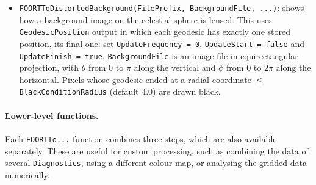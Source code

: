 \documentclass[11pt,a4paper]{article}
\newcommand{\code}[1]{{\tt #1}}
\begin{document}
\begin{itemize}
 \item \code{FOORTToDistortedBackground(FilePrefix, BackgroundFile, ...)}: shows how a background image on the celestial sphere is lensed. This uses \code{GeodesicPosition} output in which each geodesic has exactly one stored position, its final one: set \code{UpdateFrequency = 0}, \code{UpdateStart = false} and \code{UpdateFinish = true}. \code{BackgroundFile} is an image file in equirectangular projection, with $\theta$ from $0$ to $\pi$ along the vertical and $\phi$ from $0$ to $2\pi$ along the horizontal. Pixels whose geodesic ended at a radial coordinate $\leq$ \code{BlackConditionRadius} (default 4.0) are drawn black.
\end{itemize}
 
\paragraph{Lower-level functions.} Each \code{FOORTTo...} function combines three steps, which are also available separately. These are useful for custom processing, such as combining the data of several \code{Diagnostics}, using a different colour map, or analysing the gridded data numerically.
\end{document}
